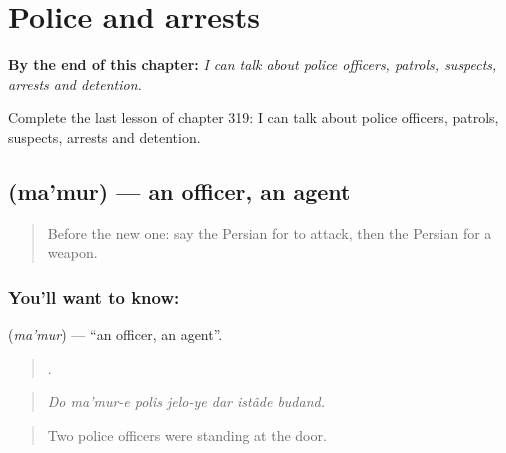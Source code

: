 
\chapter{Police and arrests}
\label{ch:fa-police-and-arrests}

\begin{chapteropening}
\textbf{By the end of this chapter:} \emph{I can talk about police officers, patrols, suspects, arrests and detention.}

Complete the last lesson of chapter 319: I can talk about police officers, patrols, suspects, arrests and detention.
\end{chapteropening}

\section[\texorpdfstring{\fa{مامور} (ma'mur)}{مامور (ma'mur)}]{ (ma'mur) — an officer, an agent}

\label{lesson:FA-C319-mamur}



\begin{quote}
Before the new one: say the Persian for to attack, then the Persian for a weapon.
\end{quote}

\subsection*{You'll want to know: }
\textbf{} (\emph{ma'mur}) — \textquotedblleft{}an officer, an agent\textquotedblright{}.

\begin{quote}
      .
\end{quote}

\begin{quote}
\emph{Do ma'mur-e polis jelo-ye dar istâde budand.}
\end{quote}

\begin{quote}
Two police officers were standing at the door.
\end{quote}

